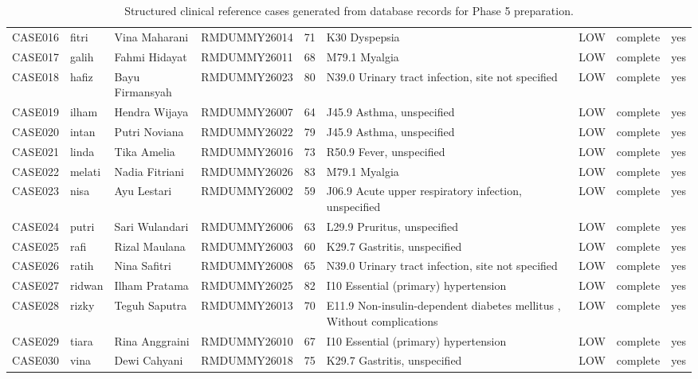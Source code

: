 \begin{table}[htbp]
\begin{tabular}{l l l l r l l l l}
CASE016 & fitri & Vina Maharani & RMDUMMY26014 & 71 & K30 Dyspepsia & LOW & complete & yes \\
CASE017 & galih & Fahmi Hidayat & RMDUMMY26011 & 68 & M79.1 Myalgia & LOW & complete & yes \\
CASE018 & hafiz & Bayu Firmansyah & RMDUMMY26023 & 80 & N39.0 Urinary tract infection, site not specified & LOW & complete & yes \\
CASE019 & ilham & Hendra Wijaya & RMDUMMY26007 & 64 & J45.9 Asthma, unspecified & LOW & complete & yes \\
CASE020 & intan & Putri Noviana & RMDUMMY26022 & 79 & J45.9 Asthma, unspecified & LOW & complete & yes \\
CASE021 & linda & Tika Amelia & RMDUMMY26016 & 73 & R50.9 Fever, unspecified & LOW & complete & yes \\
CASE022 & melati & Nadia Fitriani & RMDUMMY26026 & 83 & M79.1 Myalgia & LOW & complete & yes \\
CASE023 & nisa & Ayu Lestari & RMDUMMY26002 & 59 & J06.9 Acute upper respiratory infection, unspecified & LOW & complete & yes \\
CASE024 & putri & Sari Wulandari & RMDUMMY26006 & 63 & L29.9 Pruritus, unspecified & LOW & complete & yes \\
CASE025 & rafi & Rizal Maulana & RMDUMMY26003 & 60 & K29.7 Gastritis, unspecified & LOW & complete & yes \\
CASE026 & ratih & Nina Safitri & RMDUMMY26008 & 65 & N39.0 Urinary tract infection, site not specified & LOW & complete & yes \\
CASE027 & ridwan & Ilham Pratama & RMDUMMY26025 & 82 & I10 Essential (primary) hypertension & LOW & complete & yes \\
CASE028 & rizky & Teguh Saputra & RMDUMMY26013 & 70 & E11.9 Non-insulin-dependent diabetes mellitus ,  Without complications & LOW & complete & yes \\
CASE029 & tiara & Rina Anggraini & RMDUMMY26010 & 67 & I10 Essential (primary) hypertension & LOW & complete & yes \\
CASE030 & vina & Dewi Cahyani & RMDUMMY26018 & 75 & K29.7 Gastritis, unspecified & LOW & complete & yes \\
\hline
\end{tabular}
\caption{Structured clinical reference cases generated from database records for Phase 5 preparation.}
\label{tab:phase5-structured-reference}
\end{table}